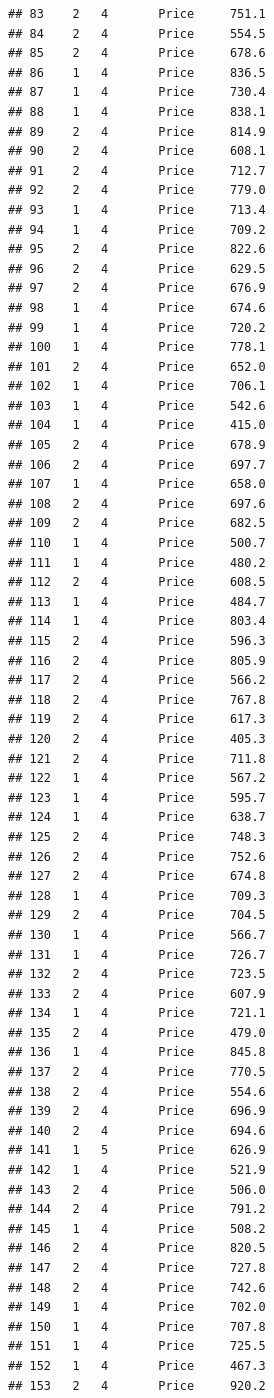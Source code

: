 \documentclass[12pt,]{krantz}
\theoremstyle{definition}
\theoremstyle{definition}
\theoremstyle{remark}
\begin{document}
\begin{verbatim}
## 83    2   4       Price     751.1
## 84    2   4       Price     554.5
## 85    2   4       Price     678.6
## 86    1   4       Price     836.5
## 87    1   4       Price     730.4
## 88    1   4       Price     838.1
## 89    2   4       Price     814.9
## 90    2   4       Price     608.1
## 91    2   4       Price     712.7
## 92    2   4       Price     779.0
## 93    1   4       Price     713.4
## 94    1   4       Price     709.2
## 95    2   4       Price     822.6
## 96    2   4       Price     629.5
## 97    2   4       Price     676.9
## 98    1   4       Price     674.6
## 99    1   4       Price     720.2
## 100   1   4       Price     778.1
## 101   2   4       Price     652.0
## 102   1   4       Price     706.1
## 103   1   4       Price     542.6
## 104   1   4       Price     415.0
## 105   2   4       Price     678.9
## 106   2   4       Price     697.7
## 107   1   4       Price     658.0
## 108   2   4       Price     697.6
## 109   2   4       Price     682.5
## 110   1   4       Price     500.7
## 111   1   4       Price     480.2
## 112   2   4       Price     608.5
## 113   1   4       Price     484.7
## 114   1   4       Price     803.4
## 115   2   4       Price     596.3
## 116   2   4       Price     805.9
## 117   2   4       Price     566.2
## 118   2   4       Price     767.8
## 119   2   4       Price     617.3
## 120   2   4       Price     405.3
## 121   2   4       Price     711.8
## 122   1   4       Price     567.2
## 123   1   4       Price     595.7
## 124   1   4       Price     638.7
## 125   2   4       Price     748.3
## 126   2   4       Price     752.6
## 127   2   4       Price     674.8
## 128   1   4       Price     709.3
## 129   2   4       Price     704.5
## 130   1   4       Price     566.7
## 131   1   4       Price     726.7
## 132   2   4       Price     723.5
## 133   2   4       Price     607.9
## 134   1   4       Price     721.1
## 135   2   4       Price     479.0
## 136   1   4       Price     845.8
## 137   2   4       Price     770.5
## 138   2   4       Price     554.6
## 139   2   4       Price     696.9
## 140   2   4       Price     694.6
## 141   1   5       Price     626.9
## 142   1   4       Price     521.9
## 143   2   4       Price     506.0
## 144   2   4       Price     791.2
## 145   1   4       Price     508.2
## 146   2   4       Price     820.5
## 147   2   4       Price     727.8
## 148   2   4       Price     742.6
## 149   1   4       Price     702.0
## 150   1   4       Price     707.8
## 151   1   4       Price     725.5
## 152   1   4       Price     467.3
## 153   2   4       Price     920.2

\end{verbatim}
\end{document}
